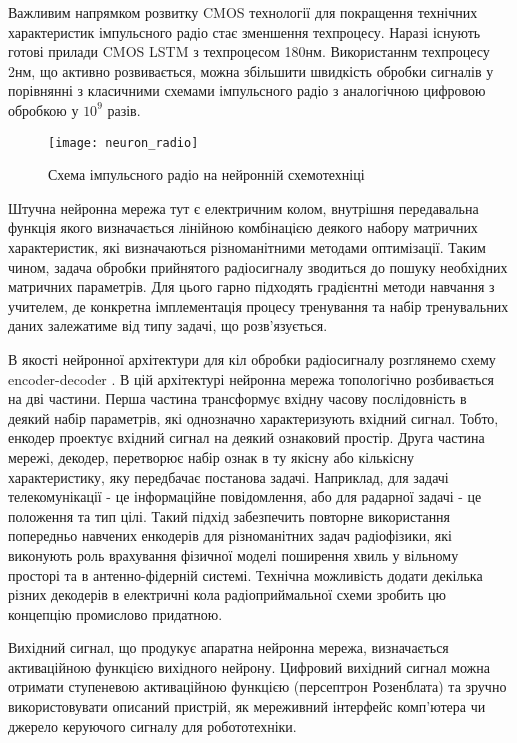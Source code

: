Важливим напрямком розвитку CMOS технології для покращення технічних 
характеристик імпульсного радіо стає зменшення техпроцесу. Наразі існують
готові прилади CMOS LSTM з техпроцесом 180нм. Використаннм техпроцесу 2нм,
що активно розвивається, можна збільшити швидкість обробки сигналів у 
порівнянні з класичними схемами імпульсного радіо з аналогічною цифровою 
обробкою у $ 10^9 $ разів.

\begin{figure}[htbp] \begin{center}
\texttt{[image: neuron\_radio]}
\caption{Схема імпульсного радіо на нейронній схемотехніці} 
\label{fig:neural_radio}
\end{center} \end{figure}

Штучна нейронна мережа тут є електричним колом, внутрішня передавальна 
функція якого визначається лінійною комбінацією деякого набору матричних 
характеристик, які визначаються різноманітними методами оптимізації. Таким 
чином, задача обробки прийнятого радіосигналу зводиться до пошуку необхідних 
матричних параметрів. Для цього гарно підходять градієнтні методи навчання 
з учителем, де конкретна імплементація процесу тренування та набір 
тренувальних даних залежатиме від типу задачі, що розв'язується.

В якості нейронної архітектури для кіл обробки радіосигналу розглянемо
схему encoder-decoder \cite{imp:Ying2017}. 
В цій архітектурі нейронна мережа топологічно розбивається на 
дві частини. Перша частина трансформує вхідну часову послідовність в деякий 
набір параметрів, які однозначно характеризують вхідний сигнал. Тобто, 
енкодер проектує вхідний сигнал на деякий ознаковий простір. Друга частина 
мережі, декодер, перетворює набір ознак в ту якісну або кількісну 
характеристику, яку передбачає постанова задачі. Наприклад, для задачі 
телекомунікації - це інформаційне повідомлення, або для радарної 
задачі - це положення та тип цілі. Такий підхід забезпечить повторне 
використання попередньо навчених енкодерів для різноманітних задач 
радіофізики, які виконують роль врахування фізичної моделі поширення хвиль 
у вільному просторі та в антенно-фідерній системі. Технічна можливість 
додати декілька різних декодерів в електричні кола радіоприймальної схеми 
зробить цю концепцію промислово придатною.

Вихідний сигнал, що продукує апаратна нейронна мережа, визначається 
активаційною функцією вихідного нейрону. Цифровий вихідний сигнал можна 
отримати ступеневою активаційною функцією (персептрон Розенблата) та зручно 
використовувати описаний пристрій, як мереживний інтерфейс комп'ютера чи 
джерело керуючого сигналу для робототехніки.

